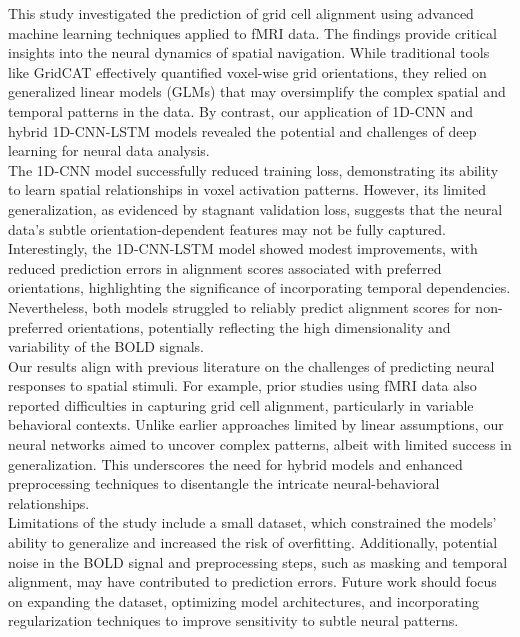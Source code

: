 \documentclass[a4paper]{article}
\begin{document}
\noindent This study investigated the prediction of grid cell alignment using advanced machine learning techniques applied to fMRI data. The findings provide critical insights into the neural dynamics of spatial navigation. While traditional tools like GridCAT effectively quantified voxel-wise grid orientations, they relied on generalized linear models (GLMs) that may oversimplify the complex spatial and temporal patterns in the data. By contrast, our application of 1D-CNN and hybrid 1D-CNN-LSTM models revealed the potential and challenges of deep learning for neural data analysis. \\

\noindent The 1D-CNN model successfully reduced training loss, demonstrating its ability to learn spatial relationships in voxel activation patterns. However, its limited generalization, as evidenced by stagnant validation loss, suggests that the neural data's subtle orientation-dependent features may not be fully captured. Interestingly, the 1D-CNN-LSTM model showed modest improvements, with reduced prediction errors in alignment scores associated with preferred orientations, highlighting the significance of incorporating temporal dependencies. Nevertheless, both models struggled to reliably predict alignment scores for non-preferred orientations, potentially reflecting the high dimensionality and variability of the BOLD signals.\\

\noindent Our results align with previous literature on the challenges of predicting neural responses to spatial stimuli. For example, prior studies using fMRI data also reported difficulties in capturing grid cell alignment, particularly in variable behavioral contexts. Unlike earlier approaches limited by linear assumptions, our neural networks aimed to uncover complex patterns, albeit with limited success in generalization. This underscores the need for hybrid models and enhanced preprocessing techniques to disentangle the intricate neural-behavioral relationships.\\

\noindent Limitations of the study include a small dataset, which constrained the models' ability to generalize and increased the risk of overfitting. Additionally, potential noise in the BOLD signal and preprocessing steps, such as masking and temporal alignment, may have contributed to prediction errors. Future work should focus on expanding the dataset, optimizing model architectures, and incorporating regularization techniques to improve sensitivity to subtle neural patterns.
\end{document}
